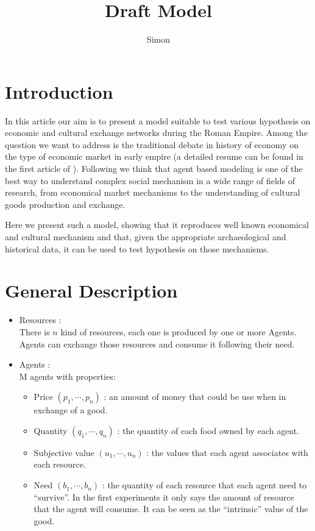 \documentclass[a4paper]{article}
\title{Draft Model}
\author{Simon}
\begin{document}
\maketitle


\section{Introduction}
In this article our aim is to present a model suitable to test various hypothesis on economic and cultural exchange networks during the Roman Empire. Among the question we want to address is the traditional debate in history of economy on the type of economic market in early empire (a detailed resume can be found in the first article of \cite{polanyi1957tradeandmarketintheearlyempireseconomiesinhistoryandtheory}). Following \cite{epstein1996growingartificialsocietiessocialsciencefromthebottomup,
lake_trends_2014,
kohler2000dynamicsinhumanandprimatesocietiesagentbasedmodelingofsocialandspatialprocesses,
tesfatsion2003agentbasedcomputationaleconomicsmodelingeconomiesascomplexadaptivesystems} we think that agent based modeling is one of the best way to understand complex social mechanism in a wide range of fields of research, from economical market mechanisms to the understanding of cultural goods production and exchange.

Here we present such a model, showing that it reproduces well known economical and cultural mechanism and that, given the appropriate archaeological and historical data, it can be used to test hypothesis on those mechanisms.

\section{General Description} 
\begin{itemize}
	\item Resources :\\
		There is $n$ kind of resources, each one is produced by one or more Agents. Agents can exchange those resources and consume it following their need.
	\item  Agents :\\
		M agents with properties:
		\begin{itemize}
			\item Price $(p_1,\cdots,p_n)$ : an amount of money that could be use when in exchange of a good.
			\item Quantity $(q_1,\cdots,q_n)$ : the quantity of each food owned by each agent.
			\item Subjective value $(u_1,\cdots,u_n)$ : the values that each agent associates with each resource.
			\item Need $(b_1, \cdots, b_n)$ :  the quantity of each resource that each agent need to ``survive''. In the first experiments it only says the amount of resource that the agent will consume. It can be seen as the ``intrinsic'' value of the good.
		\end{itemize}
\end{itemize}
\end{document}
